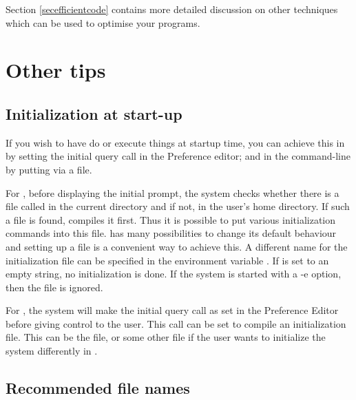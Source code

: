 Section \ref{secefficientcode} contains more detailed discussion on other
techniques which can be used to optimise your programs.


\section{Other tips}

\subsection{Initialization at start-up}

If you wish to have {\eclipse} do or execute things at startup time, you
can achieve this in {\tkeclipse} by setting the initial query call in the
Preference editor; and in the command-line  by putting via a
 file.

For ,
before displaying the initial prompt, the system checks whether there is a file
called \label{eclipserc}
in the current directory and if not, in the user's home
directory.  If such a file is found, {\eclipse} compiles it first.
Thus it is possible to put various initialization commands into
this file.
{\eclipse} has many possibilities to change its default behaviour and
setting up a  file is a convenient way to achieve this.
A different name for the initialization file can be specified
in the environment variable .
If  is set to an empty string, no initialization is done.
If the system is started with a -e option, then the  file
is ignored.

For {\tkeclipse}, the system will make the initial query call as set in the
Preference Editor before giving control to the user. This call can be set
to compile an initialization file. This can be the  file,
or some other file if the user wants to initialize the system differently in
{\tkeclipse}.

\subsection{Recommended file names}

